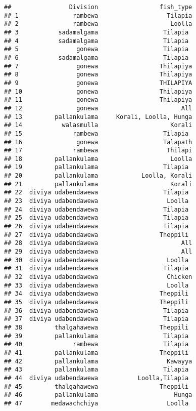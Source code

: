 \documentclass[
]{article}
\begin{document}
\begin{verbatim}
##                Division                 fish_type
## 1               rambewa                   Tilapia
## 2               rambewa                    Loolla
## 3           sadamalgama                  Tilapia 
## 4           sadamalgama                  Tilapia 
## 5                gonewa                  Tilapia 
## 6           sadamalgama                  Tilapia 
## 7                gonewa                 Thilapiya
## 8                gonewa                 Thilapiya
## 9                gonewa                 THILAPIYA
## 10               gonewa                 Thilapiya
## 11               gonewa                 Thilapiya
## 12               gonewa                       All
## 13         pallankulama     Korali, Loolla, Hunga
## 14           walasmulla                    Korali
## 15              rambewa                  Tilapia 
## 16               gonewa                  Talapath
## 17              rambewa                   Thilapi
## 18         pallankulama                    Loolla
## 19         pallankulama                  Tilapia 
## 20         pallankulama            Loolla, Korali
## 21         pallankulama                    Korali
## 22  diviya udabendawewa                  Tilapia 
## 23  diviya udabendawewa                   Loolla 
## 24  diviya udabendawewa                  Tilapia 
## 25  diviya udabendawewa                  Tilapia 
## 26  diviya udabendawewa                  Tilapia 
## 27  diviya udabendawewa                 Theppili 
## 28  diviya udabendawewa                       All
## 29  diviya udabendawewa                       All
## 30  diviya udabendawewa                   Loolla 
## 31  diviya udabendawewa                  Tilapia 
## 32  diviya udabendawewa                   Chicken
## 33  diviya udabendawewa                   Loolla 
## 34  diviya udabendawewa                 Theppili 
## 35  diviya udabendawewa                 Theppili 
## 36  diviya udabendawewa                  Tilapia 
## 37  diviya udabendawewa                  Tilapia 
## 38         thalgahawewa                 Theppili 
## 39         pallankulama                  Tilapia 
## 40              rambewa                  Tilapia 
## 41         pallankulama                 Theppili 
## 42         pallankulama                   Kawayya
## 43         pallankulama                  Tilapia 
## 44  diviya udabendawewa           Loolla,Tilapia 
## 45         thalgahawewa                 Theppili 
## 46         pallankulama                     Hunga
## 47        medawachchiya                   Loolla 

\end{verbatim}
\end{document}
